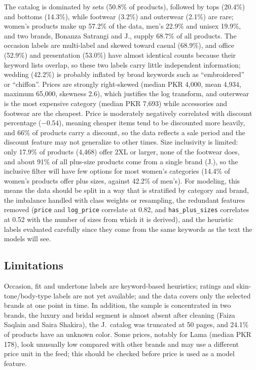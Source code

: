 The catalog is dominated by sets (50.8\% of products), followed by tops (20.4\%) and bottoms (14.3\%), while footwear (3.2\%) and outerwear (2.1\%) are rare; women's products make up 57.2\% of the data, men's 22.9\% and unisex 19.9\%, and two brands, Bonanza Satrangi and J., supply 68.7\% of all products. The occasion labels are multi-label and skewed toward casual (68.9\%), and office (52.9\%) and presentation (53.0\%) have almost identical counts because their keyword lists overlap, so these two labels carry little independent information; wedding (42.2\%) is probably inflated by broad keywords such as ``embroidered'' or ``chiffon''. Prices are strongly right-skewed (median PKR 4,000, mean 4,934, maximum 65,000, skewness 2.6), which justifies the log transform, and outerwear is the most expensive category (median PKR 7,693) while accessories and footwear are the cheapest. Price is moderately negatively correlated with discount percentage ($-0.54$), meaning cheaper items tend to be discounted more heavily, and 66\% of products carry a discount, so the data reflects a sale period and the discount feature may not generalize to other times. Size inclusivity is limited: only 17.9\% of products (4,468) offer 2XL or larger, none of the footwear does, and about 91\% of all plus-size products come from a single brand (J.), so the inclusive filter will have few options for most women's categories (14.4\% of women's products offer plus sizes, against 42.2\% of men's). For modeling, this means the data should be split in a way that is stratified by category and brand, the imbalance handled with class weights or resampling, the redundant features removed (\texttt{price} and \texttt{log\_price} correlate at 0.82, and \texttt{has\_plus\_sizes} correlates at 0.52 with the number of sizes from which it is derived), and the heuristic labels evaluated carefully since they come from the same keywords as the text the models will see.

\subsection{Limitations}
Occasion, fit and undertone labels are keyword-based heuristics; ratings and skin-tone/body-type labels are not yet available; and the data covers only the selected brands at one point in time. In addition, the sample is concentrated in two brands, the luxury and bridal segment is almost absent after cleaning (Faiza Saqlain and Saira Shakira), the J.\ catalog was truncated at 50 pages, and 24.1\% of products have an unknown color. Some prices, notably for Lama (median PKR 178), look unusually low compared with other brands and may use a different price unit in the feed; this should be checked before price is used as a model feature.